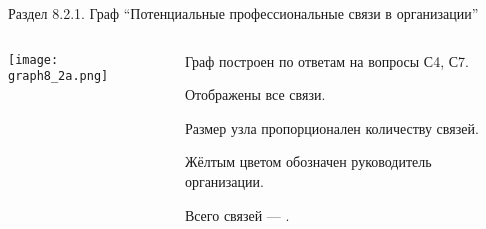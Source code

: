 \begin{frame}{Раздел 8.2.1. Граф ``Потенциальные профессиональные связи в организации''}

\begin{columns}
\begin{column}{0.75\textwidth} 
\centering
          \texttt{[image: graph8\_2a.png]}
\end{column}
\begin{column}{0.25\textwidth} 

\tiny
Граф построен по ответам на вопросы С4, С7.
\smallskip

Отображены все связи. 
\smallskip

Размер узла пропорционален количеству связей.
\smallskip

Жёлтым цветом обозначен руководитель организации.
\bigskip

Всего связей --- \valHBAlinks.

\end{column}
\end{columns}
\end{frame}



